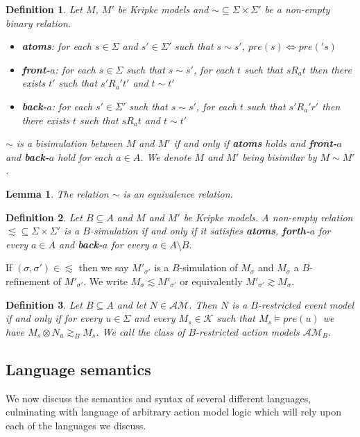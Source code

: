 \documentclass[12pt, a4paper, titlepage]{scrartcl}
\newtheorem{defn}{Definition}[section]
\newtheorem{lemma}{Lemma}[section]
\numberwithin{equation}{section}
\newcommand{\kripkeClass}{\mathcal{K}}
\newcommand{\eventClass}{\mathcal{AM}}
\begin{document}
\begin{defn} \label{bisim}
	Let $M$, $M'$ be Kripke models and $\sim \subseteq \Sigma \times \Sigma'$ be a non-empty binary
	relation.
	\begin{itemize}
		\item {\bf atoms}: for each $s \in \Sigma$ and $s' \in \Sigma'$ such that $s \sim s'$, $pre(s)
		\iff pre('s)$
		\item {\bf front-$a$}: for each $s \in \Sigma$ such that $s \sim s'$, for each $t$ such that
		$s R_a t$ then there exists $t'$ such that $s' R_a' t'$ and $t \sim t'$
		\item {\bf back-$a$}: for each $s' \in \Sigma'$ such that $s \sim s'$, for each $t$ such that
		$s' R_a' r'$ then there exists $t$ such that $s R_a t$ and $t \sim t'$
	\end{itemize}
	$\sim$ is a bisimulation between $M$ and $M'$ if and only if {\bf atoms} holds and {\bf front-$a$}
	and {\bf back-$a$} hold for each $a \in A$.
	We denote $M$ and $M'$ being bisimilar by $M \sim M'$.
\end{defn}

\begin{lemma}
	The relation $\sim$ is an equivalence relation.
\end{lemma}

\begin{defn} \label{refinement}
Let $B \subseteq A$ and $M$ and $M'$ be Kripke models. A non-empty relation $\lesssim \subseteq \Sigma
\times \Sigma'$ is a $B$-simulation if and only if it satisfies {\bf atoms}, {\bf forth-$a$} for
every $a \in A$ and {\bf back-$a$} for every $a \in A \setminus B$.
\end{defn}
If $(\sigma, \sigma') \in \lesssim$ then we say $M'_{\sigma'}$ is a $B$-simulation of $M_\sigma$ and
$M_\sigma$ a $B$-refinement of $M'_{\sigma'}$.
We write $M_{\sigma} \lesssim M'_{\sigma'}$ or equivalently $M'_{\sigma'} \gtrsim M_{\sigma}$.

\begin{defn} \label{brestrict}
Let $B \subseteq A$ and let $N \in \eventClass$. Then $N$ is a $B$-restricted event model if and
only if for every $u \in \Sigma$ and every $M_s \in \kripkeClass$ such that $M_s \models pre(u)$ we
have $M_s \otimes N_u \gtrsim_B M_s$.
We call the class of $B$-restricted action models $\mathcal{AM}_B$.
\end{defn}

\subsection{Language semantics}
We now discuss the semantics and syntax of several different languages, culminating with language of
arbitrary action model logic which will rely upon each of the languages we discuss.
\end{document}
